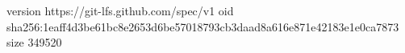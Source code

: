 version https://git-lfs.github.com/spec/v1
oid sha256:1eaff4d3be61bc8e2653d6be57018793cb3daad8a616e871e42183e1e0ca7873
size 349520
